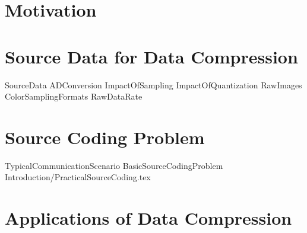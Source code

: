 





\addtitlepage
\preliminaryInfo



\section{Motivation}



\section{Source Data for Data Compression}
                {SourceData}
                {ADConversion}
                {ImpactOfSampling}
                {ImpactOfQuantization}
                {RawImages}
                {ColorSamplingFormats}
                {RawDataRate}

\section{Source Coding Problem}
    {TypicalCommunicationScenario}
       {BasicSourceCodingProblem}
       {Introduction/PracticalSourceCoding.tex}

\section{Applications of Data Compression}

